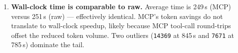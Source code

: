 \begin{enumerate}
\item \textbf{Wall-clock time is comparable to raw.}
      Average time is 249\,s (MCP) versus 251\,s (raw) --- effectively
      identical.  MCP's token savings do not translate to wall-clock
      speedup, likely because MCP tool-call round-trips offset the
      reduced token volume.  Two outliers (\texttt{14369} at 845\,s
      and \texttt{7671} at 785\,s) dominate the tail.

\end{enumerate}
